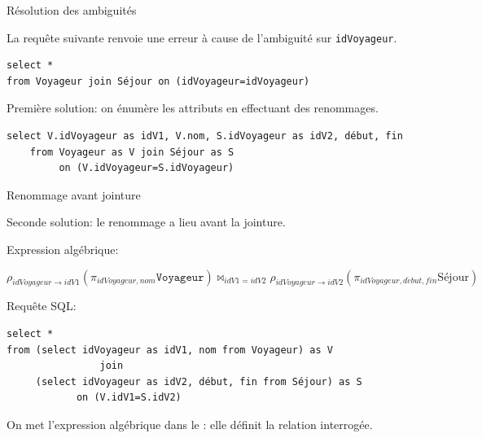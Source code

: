 \begin{frame}[fragile]{Résolution des ambiguités}

La requête suivante renvoie une erreur à cause de l'ambiguité  sur  \texttt{idVoyageur}.

\vfill

\begin{verbatim}
select *
from Voyageur join Séjour on (idVoyageur=idVoyageur)
\end{verbatim}

\vfill

Première solution: on énumère les attributs en effectuant des renommages.

\vfill

\begin{verbatim}
select V.idVoyageur as idV1, V.nom, S.idVoyageur as idV2, début, fin
    from Voyageur as V join Séjour as S  
         on (V.idVoyageur=S.idVoyageur)
\end{verbatim}

\vfill

\end{frame}

\begin{frame}[fragile]{Renommage \alert{avant} jointure}

Seconde solution: le renommage a lieu \alert{avant} la jointure. 

\vfill

Expression algébrique:
\begin{small}
 $$\rho_{idVoyageur \to idV1} (\pi_{idVoyageur, nom}\texttt{Voyageur}) \Join_{idV1=idV2} \rho_{idVoyageur \to idV2} (\pi_{idVoyageur, d\acute{e}but, fin} \text{Séjour})$$
 \end{small}
 
 \vfill
 Requête SQL:
\begin{verbatim}
select *
from (select idVoyageur as idV1, nom from Voyageur) as V 
                join 
     (select idVoyageur as idV2, début, fin from Séjour) as S  
            on (V.idV1=S.idV2)
\end{verbatim}

\vfill
\begin{blocgauche}
On met l'expression algébrique dans le : elle
définit la relation interrogée.
\end{blocgauche}
\end{frame}


